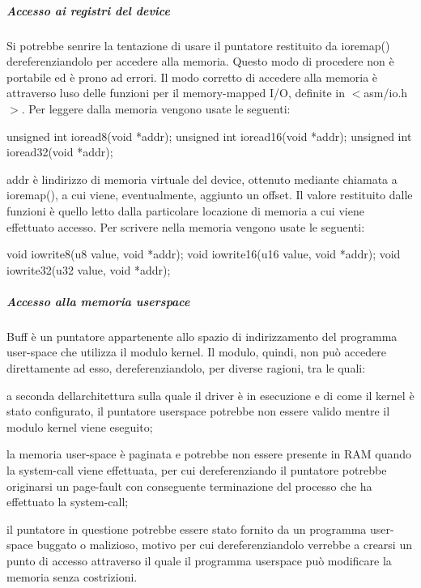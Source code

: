 \subparagraph*{Accesso ai registri del device}

Si potrebbe senrire la tentazione di usare il puntatore restituito da ioremap() dereferenziandolo per accedere alla memoria. Questo modo di procedere non è portabile ed è prono ad errori. Il modo corretto di accedere alla memoria è attraverso l\textquotesingle{}uso delle funzioni per il memory-\/mapped I/O, definite in $<$asm/io.\+h$>$. Per leggere dalla memoria vengono usate le seguenti\+: 
\begin{DoxyCode}
\textcolor{keywordtype}{unsigned} \textcolor{keywordtype}{int} ioread8(\textcolor{keywordtype}{void} *addr);
\textcolor{keywordtype}{unsigned} \textcolor{keywordtype}{int} ioread16(\textcolor{keywordtype}{void} *addr);
\textcolor{keywordtype}{unsigned} \textcolor{keywordtype}{int} ioread32(\textcolor{keywordtype}{void} *addr);
\end{DoxyCode}
 addr è l\textquotesingle{}indirizzo di memoria virtuale del device, ottenuto mediante chiamata a ioremap(), a cui viene, eventualmente, aggiunto un offset. Il valore restituito dalle funzioni è quello letto dalla particolare locazione di memoria a cui viene effettuato accesso. Per scrivere nella memoria vengono usate le seguenti\+: 
\begin{DoxyCode}
\textcolor{keywordtype}{void} iowrite8(u8 value, \textcolor{keywordtype}{void} *addr);
\textcolor{keywordtype}{void} iowrite16(u16 value, \textcolor{keywordtype}{void} *addr);
\textcolor{keywordtype}{void} iowrite32(u32 value, \textcolor{keywordtype}{void} *addr);
\end{DoxyCode}


\subparagraph*{Accesso alla memoria userspace}

Buff è un puntatore appartenente allo spazio di indirizzamento del programma user-\/space che utilizza il modulo kernel. Il modulo, quindi, non può accedere direttamente ad esso, dereferenziandolo, per diverse ragioni, tra le quali\+:
\begin{DoxyItemize}
\item a seconda dell\textquotesingle{}architettura sulla quale il driver è in esecuzione e di come il kernel è stato configurato, il puntatore userspace potrebbe non essere valido mentre il modulo kernel viene eseguito;
\item la memoria user-\/space è paginata e potrebbe non essere presente in R\+AM quando la system-\/call viene effettuata, per cui dereferenziando il puntatore potrebbe originarsi un page-\/fault con conseguente terminazione del processo che ha effettuato la system-\/call;
\item il puntatore in questione potrebbe essere stato fornito da un programma user-\/space buggato o malizioso, motivo per cui dereferenziandolo verrebbe a crearsi un punto di accesso attraverso il quale il programma userspace può modificare la memoria senza costrizioni.
\end{DoxyItemize}

